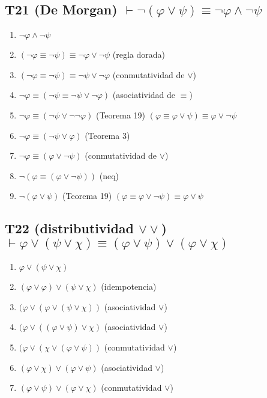 \subsection{T21 (De Morgan) $\vdash \neg(\varphi \lor \psi) \equiv \neg\varphi \land \neg\psi$}

\begin{enumerate}
    \item $\neg\varphi \land \neg\psi$
    \item $(\neg\varphi \equiv \neg\psi) \equiv \neg\varphi \lor \neg\psi$ \hfill (regla dorada)
    \item $(\neg\varphi \equiv \neg\psi) \equiv \neg\psi \lor \neg\varphi$ \hfill (conmutatividad de $\lor$)
    \item $\neg\varphi \equiv (\neg\psi \equiv \neg\psi \lor \neg\varphi)$ \hfill (asociatividad de $\equiv$)
    \item $\neg\varphi \equiv (\neg\psi \lor \neg\neg\varphi)$ \hfill (Teorema 19) $(\varphi \equiv \varphi \lor \psi) \equiv \varphi \lor \neg\psi$
    \item $\neg\varphi \equiv (\neg\psi \lor \varphi)$ \hfill (Teorema 3)
    \item $\neg\varphi \equiv (\varphi \lor \neg\psi)$ \hfill (conmutatividad de $\lor$)
    \item $\neg(\varphi \equiv (\varphi \lor \neg\psi))$ \hfill (neq)
    \item $\neg(\varphi \lor \psi)$ \hfill (Teorema 19) $(\varphi \equiv \varphi \lor \neg\psi) \equiv \varphi \lor \psi$

\end{enumerate}

\subsection{T22 (distributividad $\lor\lor$) $\vdash \varphi \lor (\psi \lor \chi) \equiv (\varphi \lor \psi) \lor (\varphi \lor \chi)$}

\begin{enumerate}
    \item $\varphi \lor (\psi \lor \chi)$
    \item $(\varphi \lor \varphi) \lor (\psi \lor \chi)$ \hfill (idempotencia)
    \item $(\varphi \lor (\varphi \lor (\psi \lor \chi))$ \hfill (asociatividad $\lor$)
    \item $(\varphi \lor ((\varphi \lor \psi) \lor \chi)$ \hfill (asociatividad $\lor$)
    \item $(\varphi \lor (\chi \lor (\varphi \lor \psi))$ \hfill (conmutatividad $\lor$)
    \item $(\varphi \lor \chi) \lor (\varphi \lor \psi)$ \hfill (asociatividad $\lor$)
    \item $(\varphi \lor \psi) \lor (\varphi \lor \chi)$ \hfill (conmutatividad $\lor$)

\end{enumerate}

